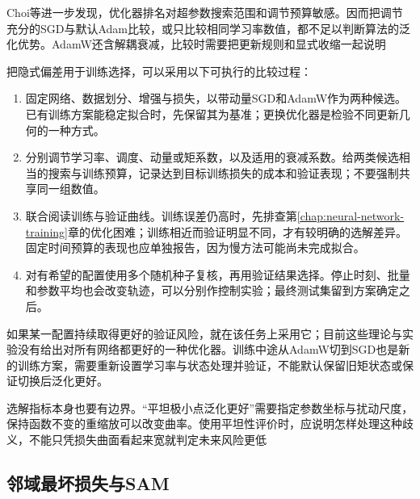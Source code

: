 Choi等进一步发现，优化器排名对超参数搜索范围和调节预算敏感。因而把调节充分的SGD与默认Adam比较，或只比较相同学习率数值，都不足以判断算法的泛化优势。AdamW还含解耦衰减，比较时需要把更新规则和显式收缩一起说明

把隐式偏差用于训练选择，可以采用以下可执行的比较过程：
\begin{enumerate}
  \item 固定网络、数据划分、增强与损失，以带动量SGD和AdamW作为两种候选。已有训练方案能稳定拟合时，先保留其为基准；更换优化器是检验不同更新几何的一种方式。
  \item 分别调节学习率、调度、动量或矩系数，以及适用的衰减系数。给两类候选相当的搜索与训练预算，记录达到目标训练损失的成本和验证表现；不要强制共享同一组数值。
  \item 联合阅读训练与验证曲线。训练误差仍高时，先排查第\ref{chap:neural-network-training}章的优化困难；训练相近而验证明显不同，才有较明确的选解差异。固定时间预算的表现也应单独报告，因为慢方法可能尚未完成拟合。
  \item 对有希望的配置使用多个随机种子复核，再用验证结果选择。停止时刻、批量和参数平均也会改变轨迹，可以分别作控制实验；最终测试集留到方案确定之后。
\end{enumerate}

如果某一配置持续取得更好的验证风险，就在该任务上采用它；目前这些理论与实验没有给出对所有网络都更好的一种优化器。训练中途从AdamW切到SGD也是新的训练方案，需要重新设置学习率与状态处理并验证，不能默认保留旧矩状态或保证切换后泛化更好。

选解指标本身也要有边界。“平坦极小点泛化更好”需要指定参数坐标与扰动尺度，保持函数不变的重缩放可以改变曲率。使用平坦性评价时，应说明怎样处理这种歧义，不能只凭损失曲面看起来宽就判定未来风险更低

\subsection{邻域最坏损失与SAM}
\label{sec:generalization-sam}

